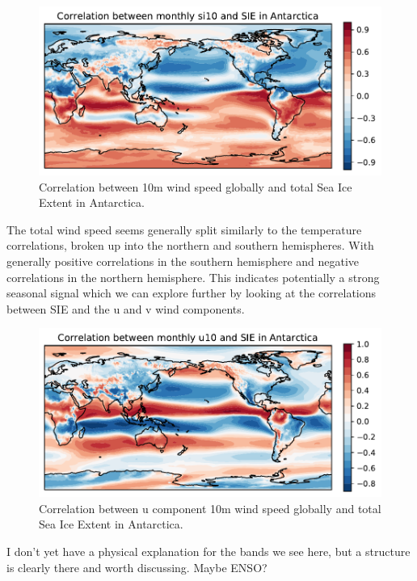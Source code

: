 \begin{figure}[H]
    \centering
    \includegraphics[width=\textwidth]{Images/global_correlation_monthly_si10_sie.pdf}
    \caption{Correlation between 10m wind speed globally and total Sea Ice Extent in Antarctica.}
    \label{fig:si10_sie_corr}
\end{figure}

The total wind speed seems generally split similarly to the temperature correlations, broken up into the northern and southern hemispheres. With generally positive correlations in the southern hemisphere and negative correlations in the northern hemisphere. This indicates potentially a strong seasonal signal which we can explore further by looking at the correlations between SIE and the u and v wind components.

\begin{figure}[H]
    \centering
    \includegraphics[width=\textwidth]{Images/global_correlation_monthly_u10_sie.pdf}
    \caption{Correlation between u component 10m wind speed globally and total Sea Ice Extent in Antarctica.}
    \label{fig:u10_sie_corr}
\end{figure}

I don't yet have a physical explanation for the bands we see here, but a structure is clearly there and worth discussing. Maybe ENSO?

